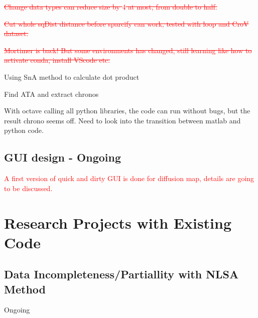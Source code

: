 \documentclass{article}
\begin{document}
\textcolor{red}{\st{Change data types can reduce size by $4$ at most, from double to half.}}

\textcolor{red}{\st{Cut whole sqDist distance before sparcify can work, tested with loop and CroV dataset.}}

\textcolor{red}{\st{Mortimer is back! But some environments has changed, still learning like how to activate conda, install VScode etc.}}


\noindent Using SnA method to calculate dot product

\noindent Find ATA and extract chronos

\noindent With octave calling all python libraries, the code can run without bugs, but the result chrono seems off. Need to look into the transition between matlab and python code.

\subsection*{GUI design - Ongoing}
\textcolor{red}{A first version of quick and dirty GUI is done for diffusion map, details are going to be discussed.}

\section*{Research Projects with Existing Code}
\subsection*{Data Incompleteness/Partiallity with NLSA Method}
Ongoing
\end{document}
